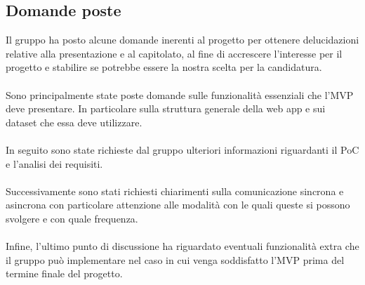 \subsection{Domande poste}
Il gruppo ha posto alcune domande inerenti al progetto per ottenere delucidazioni relative alla presentazione e al capitolato, al fine di accrescere l'interesse per il progetto e stabilire se potrebbe essere la nostra scelta per la candidatura.\\
\\
Sono principalmente state poste domande sulle funzionalità essenziali che l'MVP deve presentare. In particolare sulla struttura generale della web app e sui dataset che essa deve utilizzare.\\
\\
In seguito sono state richieste dal gruppo ulteriori informazioni riguardanti il PoC e l'analisi dei requisiti.\\
\\
Successivamente sono stati richiesti chiarimenti sulla comunicazione sincrona e asincrona con particolare attenzione alle modalità con le quali queste si possono svolgere e con quale frequenza.\\
\\
Infine, l'ultimo punto di discussione ha riguardato eventuali funzionalità extra che il gruppo può implementare nel caso in cui venga soddisfatto l'MVP prima del termine finale del progetto.
\\
